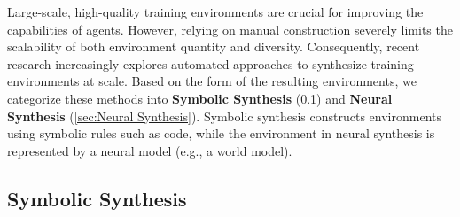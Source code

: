 \documentclass{llmxive}
\providecommand{\Text}{
  \begin{tikzpicture}[baseline=(char.base)]
    \fill[textgreen!50] (0,0) circle (0.18);
    \node[white, font=\scriptsize\rmfamily, inner sep=0pt] (char) at (0,0) {T};
  \end{tikzpicture}
}
\begin{document}




Large-scale, high-quality training environments are crucial for improving the capabilities of agents. However, relying on manual construction severely limits the scalability of both environment quantity and diversity. Consequently, recent research increasingly explores automated approaches to synthesize training environments at scale. Based on the form of the resulting environments, we categorize these methods into \textbf{Symbolic Synthesis} (\cref{sec:Symbolic Synthesis}) and \textbf{Neural Synthesis} (\cref{sec:Neural Synthesis}). Symbolic synthesis constructs environments using symbolic rules such as code, while the environment in neural synthesis is represented by a neural model (e.g., a world model).

\subsection{Symbolic Synthesis}
\label{sec:Symbolic Synthesis}
\end{document}
